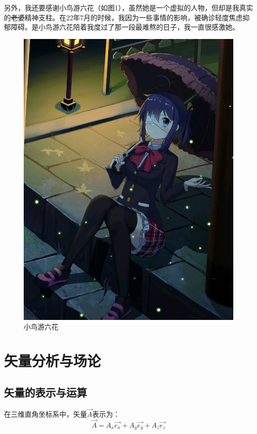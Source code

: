 \documentclass[UTF8,a4paper,11pt]{article}
\begin{document}
另外，我还要感谢小鸟游六花（如图1），虽然她是一个虚拟的人物，但却是我真实的\sout{老婆}精神支柱。在22年7月的时候，我因为一些事情的影响，被确诊轻度焦虑抑郁障碍。是小鸟游六花陪着我度过了那一段最难熬的日子，我一直很感激她。
\begin{figure}[htbp]
\centering
\includegraphics[scale=0.3]{p1.png}
\caption{小鸟游六花}
\end{figure}

\section{矢量分析与场论}
\subsection{矢量的表示与运算}
在三维直角坐标系中，矢量$\overrightarrow{A}$表示为：
\begin{equation}
\overrightarrow{A}=A_x\overrightarrow{e_x}+A_y\overrightarrow{e_y}+A_z\overrightarrow{e_z}
\end{equation}
\end{document}
